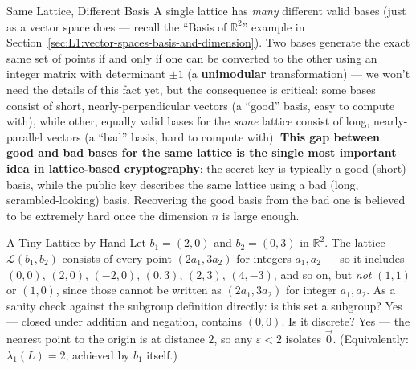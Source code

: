 \begin{rmkbox}{Same Lattice, Different Basis}
A single lattice has \emph{many} different valid bases (just as a vector space does --- recall the ``Basis of $\mathbb{R}^2$'' example in Section~\ref{sec:L1:vector-spaces-basis-and-dimension}). Two bases generate the exact same set of points if and only if one can be converted to the other using an integer matrix with determinant $\pm 1$ (a \textbf{unimodular} transformation) --- we won't need the details of this fact yet, but the consequence is critical: some bases consist of short, nearly-perpendicular vectors (a ``good'' basis, easy to compute with), while other, equally valid bases for the \emph{same} lattice consist of long, nearly-parallel vectors (a ``bad'' basis, hard to compute with). \textbf{This gap between good and bad bases for the same lattice is the single most important idea in lattice-based cryptography}: the secret key is typically a good (short) basis, while the public key describes the same lattice using a bad (long, scrambled-looking) basis. Recovering the good basis from the bad one is believed to be extremely hard once the dimension $n$ is large enough.
\end{rmkbox}

\begin{exbox}{A Tiny Lattice by Hand}
Let $b_1 = (2,0)$ and $b_2 = (0,3)$ in $\mathbb{R}^2$. The lattice $\mathcal{L}(b_1,b_2)$ consists of every point $(2a_1, 3a_2)$ for integers $a_1, a_2$ --- so it includes $(0,0)$, $(2,0)$, $(-2,0)$, $(0,3)$, $(2,3)$, $(4,-3)$, and so on, but \emph{not} $(1,1)$ or $(1,0)$, since those cannot be written as $(2a_1, 3a_2)$ for integer $a_1, a_2$. As a sanity check against the subgroup definition directly: is this set a subgroup? Yes --- closed under addition and negation, contains $(0,0)$. Is it discrete? Yes --- the nearest point to the origin is at distance $2$, so any $\varepsilon < 2$ isolates $\vec 0$. (Equivalently: $\lambda_1(L) = 2$, achieved by $b_1$ itself.)
\end{exbox}

